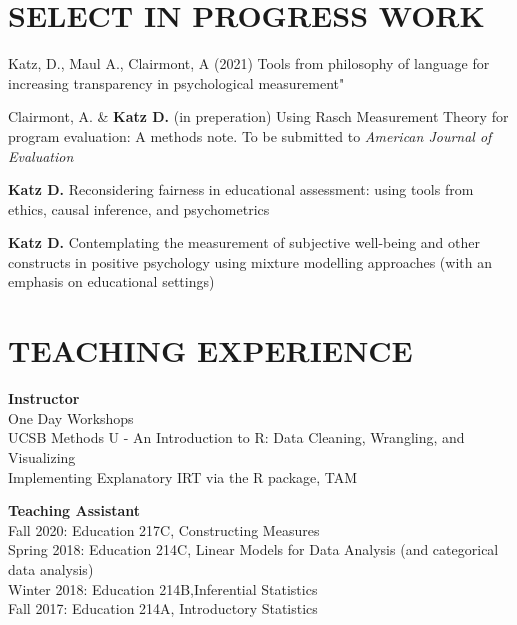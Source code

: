 \documentclass[12pt, oneside,]{memoir}
\begin{document}
\hypertarget{select-in-progress-work}{%
\section{SELECT IN PROGRESS WORK}\label{select-in-progress-work}}
\begin{hangparas}{.25in}{1}

Katz, D., Maul A., Clairmont, A (2021) Tools from philosophy of language
for increasing transparency in psychological measurement"

\noindent Clairmont, A. \& \textbf{Katz D.} (in preperation) Using Rasch
Measurement Theory for program evaluation: A methods note. To be
submitted to \emph{American Journal of Evaluation}

\noindent \textbf{Katz D.} Reconsidering fairness in educational assessment: using
tools from ethics, causal inference, and psychometrics

\noindent \textbf{Katz D.} Contemplating the measurement of subjective well-being and other constructs in positive psychology using mixture modelling approaches (with an emphasis on educational settings)
\end{hangparas}
\vspace{4mm}

\hypertarget{teaching-experience}{%
\section{TEACHING EXPERIENCE}\label{teaching-experience}}

\noindent\textbf{Instructor}\\
\noindent One Day Workshops\\
\hspace*{0.333em}\hspace*{0.333em}UCSB Methods U - An Introduction to R: Data Cleaning, Wrangling, and Visualizing\\
\hspace*{0.333em}\hspace*{0.333em}Implementing Explanatory IRT via the R package, TAM
\vspace{4mm}

\noindent \textbf{Teaching Assistant}\\
\hspace*{0.333em}\hspace*{0.333em}Fall 2020: Education 217C, Constructing Measures\\
\hspace*{0.333em}\hspace*{0.333em}Spring 2018: Education 214C, Linear Models for Data Analysis (and categorical data analysis)\\
\hspace*{0.333em}\hspace*{0.333em}Winter 2018: Education 214B,Inferential Statistics\\
\hspace*{0.333em}\hspace*{0.333em}Fall 2017: Education 214A, Introductory Statistics
\vspace{4mm}
\end{document}
